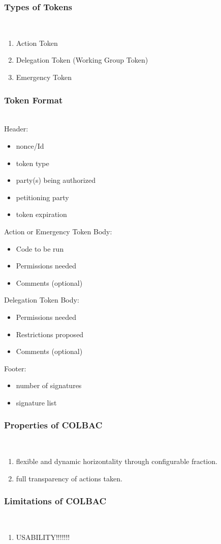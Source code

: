\subsubsection{Types of Tokens}
\mbox{}\\
\begin{enumerate}
\item Action Token
\item Delegation Token (Working Group Token)
\item Emergency Token
\end{enumerate}

\subsubsection{Token Format}
\mbox{}\\
Header:
\begin{itemize}
\item nonce/Id
\item token type
\item party(s) being authorized
\item petitioning party
\item token expiration
\end{itemize}
Action or Emergency Token Body:
\begin{itemize}
\item Code to be run
\item Permissions needed
\item Comments (optional)
\end{itemize}
Delegation Token Body:
\begin{itemize}
\item Permissions needed
\item Restrictions proposed
\item Comments (optional)
\end{itemize}
Footer:
\begin{itemize}
\item number of signatures
\item signature list
\end{itemize}

\subsubsection{Properties of COLBAC}
\mbox{}\\
\begin{enumerate}
\item flexible and dynamic horizontality through configurable fraction.
\item full transparency of actions taken.
\end{enumerate}

\subsubsection{Limitations of COLBAC}
\mbox{}\\
\begin{enumerate}
\item USABILITY!!!!!!!
\end{enumerate}
